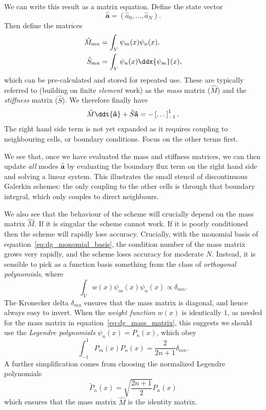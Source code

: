 We can write this result as a matrix equation. Define the state vector
%
\begin{equation}
  \label{eq:dg_state_vector}
  \mathbf{\hat{a}} = (\hat{a}_0, \dots, \hat{a}_N).
\end{equation}
%
Then define the matrices
%
\begin{align}
  \label{eq:dg_mass_matrix}
  \hat{M}_{mn} &= \int_V \psi_m(x) \psi_n(x), \\
  \label{eq:dg_stiffness_matrix}
  \hat{S}_{mn} &= \int_V \psi_n(x) \ddx{\psi_m}(x),
\end{align}
%
which can be pre-calculated and stored for repeated use. These are typically
referred to (building on finite \emph{element} work) as the \emph{mass} matrix
($\hat{M}$) and the \emph{stiffness} matrix ($\hat{S}$). We therefore finally
have
%
\begin{equation}
  \label{eq:dg_advection5}
  \hat{M} \ddt{\mathbf{\hat{a}}} + \hat{S} \mathbf{\hat{a}} = -\left[ \dots \right]_{-1}^1.
\end{equation}
%
The right hand side term is not yet expanded as it requires coupling to
neighbouring cells, or boundary conditions. Focus on the other terms first.

We see that, once we have evaluated the mass and stiffness matrices, we can then
update \emph{all} modes $\mathbf{\hat{a}}$ by evaluating the boundary flux term
on the right hand side and solving a linear system. This illustrates the small
stencil of discontinuous Galerkin schemes: the only coupling to the other cells
is through that boundary integral, which only couples to direct neighbours.

We also see that the behaviour of the scheme will crucially depend on the mass
matrix $\hat{M}$. If it is singular the scheme cannot work. If it is poorly
conditioned then the scheme will rapidly lose accuracy. Crucially, with the
monomial basis of equation~\ref{eq:dg_monomial_basis}, the condition number of
the mass matrix grows very rapidly, and the scheme loses accuracy for moderate
$N$. Instead, it is sensible to pick as a function basis something from the class
of \emph{orthogonal polynomials}, where
%
\begin{equation}
  \label{eq:dg_orthog_polys}
  \int_V w(x) \psi_m(x) \psi_n(x) \propto \delta_{mn}.
\end{equation}
%
The Kronecker delta $\delta_{mn}$ ensures that the mass matrix is diagonal, and
hence always easy to invert.
When the \emph{weight function} $w(x)$ is identically $1$, as needed for the
mass matrix in equation~\ref{eq:dg_mass_matrix}, this suggests we should use the
\emph{Legendre polynomials} $\psi_n(x) = P_n(x)$, which obey
%
\begin{equation}
  \label{eq:dg_legendre_poly}
  \int_{-1}^1 P_m(x) P_n(x) = \frac{2}{2 n + 1} \delta_{mn}.
\end{equation}
%
A further simplification comes from choosing the normalized Legendre polynomials
%
\begin{equation}
  \label{eq:dg_legendre_poly_norm}
  \tilde{P}_n(x) = \sqrt{\frac{2 n + 1}{2}} P_n(x)
\end{equation}
%
which ensures that the mass matrix $\hat{M}$ is the identity matrix.

